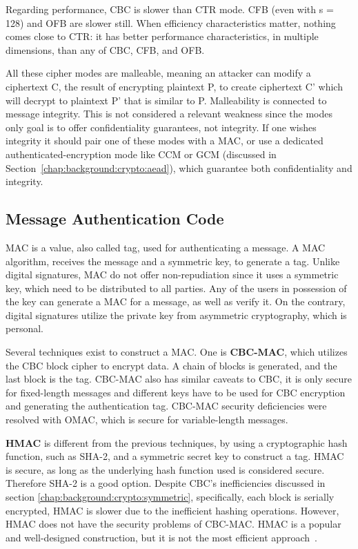 Regarding performance, \ac{CBC} is slower than \ac{CTR} mode. \ac{CFB} (even with s = 128) and \ac{OFB} are slower still.
When efficiency characteristics matter, nothing comes close to \ac{CTR}: it has better performance characteristics, in multiple dimensions, than any of \ac{CBC}, \ac{CFB}, and \ac{OFB}.

All these cipher modes are malleable, meaning an attacker can modify a ciphertext C, the result of encrypting plaintext P, to create ciphertext C' which will decrypt to plaintext P' that is similar to P. Malleability is connected to message integrity. This is not considered a relevant weakness since the modes only goal is to offer confidentiality guarantees, not integrity. If one wishes integrity it should pair one of these modes with a \ac{MAC}, or use a dedicated authenticated-encryption mode like \ac{CCM} or \ac{GCM} (discussed in Section~\ref{chap:background:crypto:aead}), which guarantee both confidentiality and integrity.

\subsection{Message Authentication Code}\label{chap:background:crypto:mac}

\ac{MAC} is a value, also called tag, used for authenticating a message.
A \ac{MAC} algorithm, receives the message and a symmetric key, to generate a tag. Unlike digital signatures, \ac{MAC} do not offer non-repudiation since it uses a symmetric key, which need to be distributed to all parties. Any of the users in possession of the key can generate a \ac{MAC} for a message, as well as verify it. On the contrary, digital signatures utilize the private key from asymmetric cryptography, which is personal.

Several techniques exist to construct a \ac{MAC}. One is \textbf{\ac{CBC-MAC}}, which utilizes the \ac{CBC} block cipher to encrypt data. A chain of blocks is generated, and the last block is the tag.
\ac{CBC-MAC} also has similar caveats to \ac{CBC}, it is only secure for fixed-length messages \cite{aesmodes} and different keys have to be used for \ac{CBC} encryption and generating the authentication tag. 
\ac{CBC-MAC} security deficiencies were resolved with \ac{OMAC}, which is secure for variable-length messages.

\textbf{\ac{HMAC}} is different from the previous techniques, by using a cryptographic hash function, such as SHA-2, and a symmetric secret key to construct a tag. \ac{HMAC} is secure, as long as the underlying hash function used is considered secure. Therefore SHA-2 is a good option.
Despite \ac{CBC}'s inefficiencies discussed in section \ref{chap:background:crypto:symmetric}, specifically, each block is serially encrypted, \ac{HMAC} is slower due to the inefficient hashing operations. However, \ac{HMAC} does not have the security problems of \ac{CBC-MAC}. \ac{HMAC} is a popular and well-designed construction, but it is not the most efficient approach~\cite{aesmodes}.


